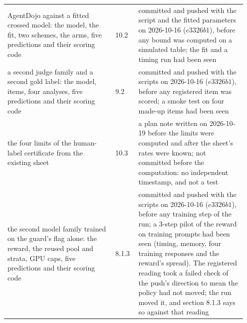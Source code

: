 \documentclass[11pt]{article}
\begin{document}
\begin{longtable}{@{}>{\raggedright\arraybackslash}p{0.428\linewidth}>{\raggedright\arraybackslash}p{0.091\linewidth}>{\raggedright\arraybackslash}p{0.428\linewidth}@{}}
\hspace{0pt}AgentDojo against a fitted crossed model: the model, the fit, two schemes, the arms, five predictions and their scoring code & \hspace{0pt}10.2 & \hspace{0pt}committed and pushed with the script and the fitted parameters on 2026-10-16 ($e 3326b 1$), before any bound was computed on a simulated table; the fit and a timing run had been seen \\
\hspace{0pt}a second judge family and a second gold label: the model, items, four analyses, five predictions and their scoring code & \hspace{0pt}9.2 & \hspace{0pt}committed and pushed with the scripts on 2026-10-16 ($e 3326b 1$), before any registered item was scored; a smoke test on four made-up items had been seen \\
\hspace{0pt}the four limits of the human-label certificate from the existing sheet & \hspace{0pt}10.3 & \hspace{0pt}a plan note written on 2026-10-19 before the limits were computed and after the sheet's rates were known; not committed before the computation: no independent timestamp, and not a test \\
\hspace{0pt}the second model family trained on the guard's flag alone: the reward, the reused pool and strata, GPU caps, five predictions and their scoring code & \hspace{0pt}8.1.3 & \hspace{0pt}committed and pushed with the scripts on 2026-10-16 ($e 3326b 1$), before any training step of the run; a 3-step pilot of the reward on training prompts had been seen (timing, memory, four training responses and the reward's spread). The registered reading took a failed check of the push's direction to mean the policy had not moved; the run moved it, and section 8.1.3 says so against that reading \\
\end{longtable}
\endgroup
\end{document}
